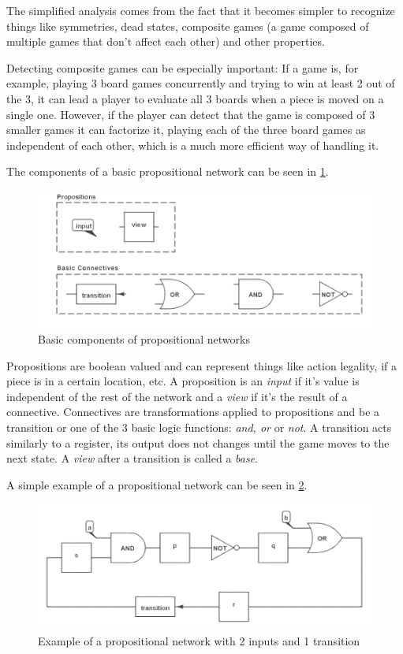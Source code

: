 The simplified analysis comes from the fact that it becomes simpler to recognize things like symmetries, dead states, composite games (a game composed of multiple games that don't affect each other) and other properties. 

Detecting composite games can be especially important: If a game is, for example, playing 3 board games concurrently and trying to win at least 2 out of the 3, it can lead a player to evaluate all 3 boards when a piece is moved on a single one. However, if the player can detect that the game is composed of 3 smaller games it can factorize it, playing each of the three board games as independent of each other, which is a much more efficient way of handling it.

The components of a basic propositional network can be seen in \ref{fig:propnets components}.

\begin{figure}[h]
	\centering
    \includegraphics[scale=0.45]{images/propnets_components.png}
    \caption{Basic components of propositional networks}
    \label{fig:propnets components}
\end{figure}

Propositions are boolean valued and can represent things like action legality, if a piece is in a certain location, etc. A proposition is an \textit{input} if it's value is independent of the rest of the network and a \textit{view} if it's the result of a connective.
Connectives are transformations applied to propositions and be a transition or one of the 3 basic logic functions: \textit{and, or} or \textit{not}. A transition acts similarly to a register, its output does not changes until the game moves to the next state. A \textit{view} after a transition is called a \textit{base}.

A simple example of a propositional network can be seen in \ref{fig:propnets example}.

\begin{figure}[h]
	\centering
    \includegraphics[scale=0.45]{images/propnets_example.png}
    \caption{Example of a propositional network with 2 inputs and 1 transition}
    \label{fig:propnets example}
\end{figure}


